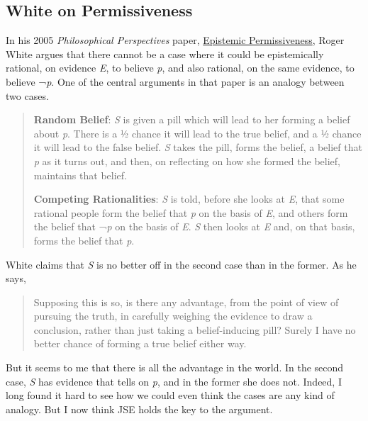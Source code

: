 \documentclass[
  10pt,
  letterpaper,
  DIV=11,
  numbers=noendperiod,
  twoside]{scrartcl}
\begin{document}
\subsection{White on Permissiveness}\label{white-on-permissiveness}

In his 2005 \emph{Philosophical Perspectives} paper,
\href{http://philosophy.fas.nyu.edu/docs/IO/1180/EP.pdf}{Epistemic
Permissiveness}, Roger White argues that there cannot be a case where it
could be epistemically rational, on evidence \emph{E}, to believe
\emph{p}, and also rational, on the same evidence, to believe ¬\emph{p}.
One of the central arguments in that paper is an analogy between two
cases.

\begin{quote}
\textbf{Random Belief}: \emph{S} is given a pill which will lead to her
forming a belief about \emph{p}. There is a ½ chance it will lead to the
true belief, and a ½ chance it will lead to the false belief. \emph{S}
takes the pill, forms the belief, a belief that \emph{p} as it turns
out, and then, on reflecting on how she formed the belief, maintains
that belief.

\textbf{Competing Rationalities}: \emph{S} is told, before she looks at
\emph{E}, that some rational people form the belief that \emph{p} on the
basis of \emph{E}, and others form the belief that ¬\emph{p} on the
basis of \emph{E}. \emph{S} then looks at \emph{E} and, on that basis,
forms the belief that \emph{p}.
\end{quote}

White claims that \emph{S} is no better off in the second case than in
the former. As he says,

\begin{quote}
Supposing this is so, is there any advantage, from the point of view of
pursuing the truth, in carefully weighing the evidence to draw a
conclusion, rather than just taking a belief-inducing pill? Surely I
have no better chance of forming a true belief either way.
\end{quote}

But it seems to me that there is all the advantage in the world. In the
second case, \emph{S} has evidence that tells on \emph{p}, and in the
former she does not. Indeed, I long found it hard to see how we could
even think the cases are any kind of analogy. But I now think JSE holds
the key to the argument.
\end{document}
